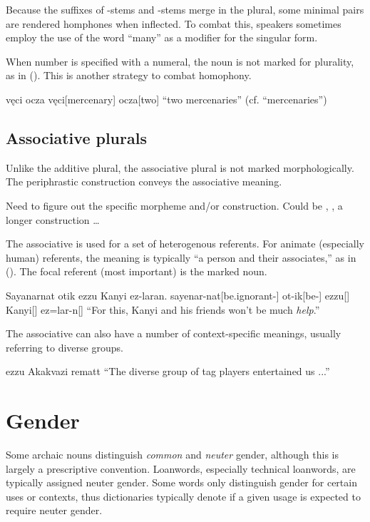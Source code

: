 Because the suffixes of -stems and -stems merge in the plural, some minimal pairs are rendered homphones when inflected. To combat this, speakers sometimes employ the use of the word  “many” as a modifier for the singular form.

When number is specified with a numeral, the noun is not marked for plurality, as in (\nextx). This is another strategy to combat homophony.

\ex \begingl
\glpreamble vęci ocza \endpreamble
vęci[mercenary]
ocza[two]
\glft “two mercenaries”
\trailingcitation (cf.  “mercenaries”)
\endgl \xe

\subsection{Associative plurals}
Unlike the additive plural, the associative plural is not marked morphologically. The periphrastic construction  conveys the associative meaning. 

\begin{kaobox}
Need to figure out the specific morpheme and/or construction. Could be , , a longer construction \dots
\end{kaobox}

The associative is used for a set of heterogenous referents. For animate (especially human) referents, the meaning is typically “a person and their associates,” as in (\nextx). The focal referent (\ie most important) is the marked noun.

\ex \begingl
\glpreamble Sayanarnat otik ezzu Kanyi ez-laran. \endpreamble
sayenar-nat[be.ignorant-]
ot-ik[be-]
ezzu[]
Kanyi[]
ez=lar-n[]
\glft “For this, Kanyi and his friends won't be much \emph{help}.”
\endgl \xe

The associative can also have a number of context-specific meanings, usually referring to diverse groups.

\pex 
\a \begingl
\glpreamble ezzu Akakvazi rematt \endpreamble
\glft “The diverse group of tag players entertained us ...”
\endgl 
\xe

\section{Gender}
Some archaic nouns distinguish \emph{common} and \emph{neuter} gender, although this is largely a prescriptive convention.  Loanwords, especially technical loanwords, are typically assigned neuter gender. Some words only distinguish gender for certain uses or contexts, thus dictionaries typically denote if a given usage is expected to require neuter gender.

